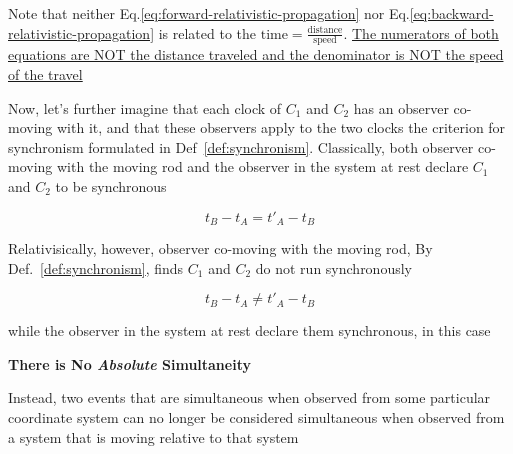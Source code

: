 Note that neither Eq.\ref{eq:forward-relativistic-propagation} nor Eq.\ref{eq:backward-relativistic-propagation} is
related to the $\text{time} = \frac{\text{distance}}{\text{speed}}$. \href{https://qr.ae/psQeNd}{The numerators of
both equations are NOT the distance traveled and the denominator is NOT the speed of the travel}

\begin{tcolorbox}[
enhanced,
skin=enhancedlast jigsaw,interior hidden,
boxsep=0pt,top=0pt,colframe=red,coltitle=red!50!black,
attach boxed title to bottom center,
boxed title style={empty,boxrule=0.5mm},
varwidth boxed title=0.5\linewidth,
underlay boxed title={
    \draw[white,line width=0.5mm]
    ([xshift=0.3mm-\tcboxedtitleheight*2,yshift=0.3mm]title.north west)
    --([xshift=-0.3mm+\tcboxedtitleheight*2,yshift=0.3mm]title.north east);
    \path[draw=red,top color=white,bottom color=red!50!white,line width=0.5mm]
    ([xshift=0.25mm-\tcboxedtitleheight*2,yshift=0.25mm]title.north west)
    cos +(\tcboxedtitleheight,-\tcboxedtitleheight/2)
    sin +(\tcboxedtitleheight,-\tcboxedtitleheight/2)
    -- ([xshift=0.25mm,yshift=0.25mm]title.south west)
    -- ([yshift=0.25mm]title.south east)
    cos +(\tcboxedtitleheight,\tcboxedtitleheight/2)
    sin +(\tcboxedtitleheight,\tcboxedtitleheight/2); },
title=we have a contradiction,
watermark graphics=烟绯-11.png,
watermark opacity=0.3
]
Now, let's further imagine that each clock of $C_1$ and $C_2$ has an observer co-moving with it, and that these
observers apply to the two clocks the criterion for synchronism formulated in Def~\ref{def:synchronism}. Classically,
both observer co-moving with the moving rod and the observer in the system at rest declare $C_1$ and $C_2$ to be
synchronous

\begin{equation}\label{eq:synchronized-clocks}
    t_B - t_A = t'_A - t_B
\end{equation}

Relativisically, however, observer co-moving with the moving rod, By Def.~\ref{def:synchronism}, finds $C_1$ and $C_2$ do not run synchronously

\begin{equation}\label{eq:unsynchronized-clocks}
    t_B - t_A \ne t'_A - t_B
\end{equation}

while the observer in the system at rest declare them synchronous, in this case
\end{tcolorbox}

\begin{tcolorbox}[
    colback=green!5!white,
    colframe=green!55!black,
    title=How do we resolve the contradiction?
]
    \begin{center}
        \textbf{There is No \textit{Absolute} Simultaneity}
    \end{center}

    Instead, two events that are simultaneous when observed from some particular coordinate system can no longer be
    considered simultaneous when observed from a system that is moving relative to that system
\end{tcolorbox}

